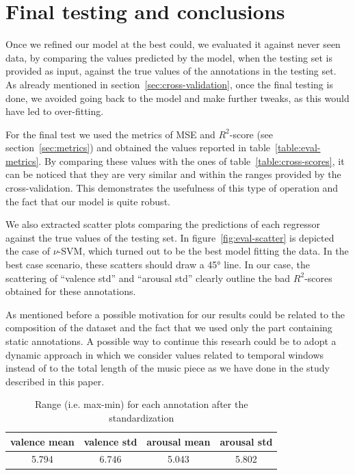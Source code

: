 \section{Final testing and conclusions}\label{sec:conclusions}

Once we refined our model at the best could, we evaluated it against never seen data, by comparing the values predicted by the model, when the testing set is provided as input, against the true values of the annotations in the testing set. As already mentioned in section~\ref{sec:cross-validation}, once the final testing is done, we avoided going back to the model and make further tweaks, as this would have led to over-fitting.

For the final test we used the metrics of MSE and $R^2$-score (see section~\ref{sec:metrics}) and obtained the values reported in table~\ref{table:eval-metrics}. By comparing these values with the ones of table~\ref{table:cross-scores}, it can be noticed that they are very similar and within the ranges provided by the cross-validation. This demonstrates the usefulness of this type of operation and the fact that our model is quite robust.


We also extracted scatter plots comparing the predictions of each regressor against the true values of the testing set. In  figure~\ref{fig:eval-scatter} is depicted the case of $\nu$-SVM, which turned out to be the best model fitting the data. In the best case scenario, these scatters should draw a 45° line. In our case, the scattering of ``valence std'' and ``arousal std'' clearly outline the bad $R^2$-scores obtained for these annotations.

As mentioned before a possible motivation for our results could be related to the composition of the dataset and the fact that we used only the part containing static annotations. A possible way to continue this researh could be to adopt a dynamic approach in which we consider values related to temporal windows instead of to the total length of the music piece as we have done in the study described in this paper. 

\begin{table}
	\centering
	\begin{tabular}{cccc}
		\toprule
		valence mean & valence std & arousal mean & arousal std \\
		\midrule
	    5.794 & 6.746 & 5.043 & 5.802 \\
		\bottomrule
	\end{tabular}
	\caption{Range (i.e. max-min) for each annotation after the standardization}
	\label{table:annot-ranges}
\end{table}

